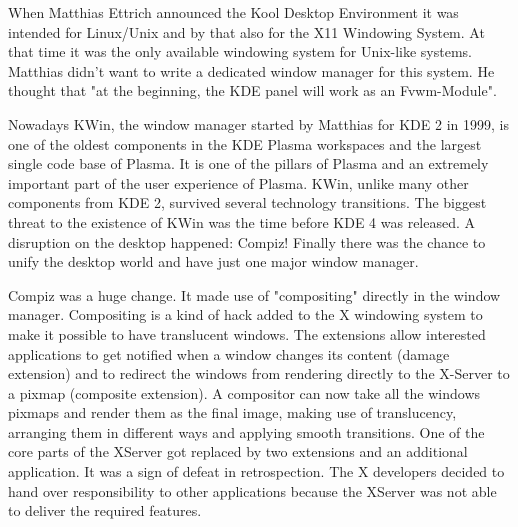 
\noindent{}When Matthias Ettrich announced the Kool Desktop Environment it was intended for Linux/Unix and by that also for the X11 Windowing System. At that time it was the only available windowing system for Unix-like systems. Matthias didn't want to write a dedicated window manager for this system. He thought that "at the beginning, the KDE panel will work as an Fvwm-Module".

Nowadays KWin, the window manager started by Matthias for KDE 2 in 1999, is one of the oldest components in the KDE Plasma workspaces and the largest single code base of Plasma. It is one of the pillars of Plasma and an extremely important part of the user experience of Plasma. KWin, unlike many other components from KDE 2, survived several technology transitions. The biggest threat to the existence of KWin was the time before KDE 4 was released. A disruption on the desktop happened: Compiz! Finally there was the chance to unify the desktop world and have just
one major window manager.

Compiz was a huge change. It made use of "compositing" directly in the window manager. Compositing is a kind of hack added to the X windowing system to make it possible to have translucent windows. The extensions allow interested applications to get notified when a window changes its content (damage extension) and to redirect the windows from rendering directly to the X-Server to a pixmap (composite extension). A compositor can now take all the windows pixmaps and render them as the final image, making use of translucency, arranging them in different ways and applying smooth transitions. One of the core parts of the XServer got replaced by two extensions and an additional application. It was a sign of defeat in retrospection. The X developers decided to hand over responsibility to other applications because the XServer was not able to deliver the required features.


